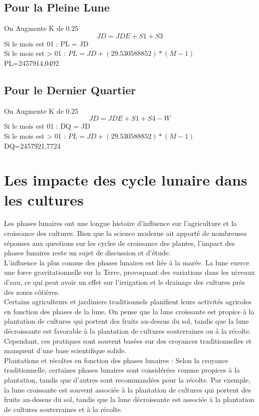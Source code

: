 \subsection{Pour la Pleine Lune}
On Augmente K de 0.25   
 \[JD = JDE + S1 + S3\] 
Si le mois est 01 : PL = JD\\
Si le mois est > 01 : $PL = JD + (29.530588852) * (M - 1)$ \\
PL=2457914,0492
\subsection{Pour le Dernier Quartier}
On Augmente K de 0.25  
 \[JD = JDE + S1 + S4 - W\]
Si le mois est 01 : DQ = JD\\ 
Si le mois est > 01 : $PL = JD + (29.530588852) * (M - 1)$\\ 
DQ=2457921,7724
\section{Les impacte des cycle lunaire dans les cultures}
Les phases lunaires ont une longue histoire d'influence sur l'agriculture et la croissance des cultures. Bien que la science moderne ait apporté de nombreuses réponses aux questions sur les cycles de croissance des plantes, l'impact des phases lunaires reste un sujet de discussion et d'étude.\\

L'influence la plus connue des phases lunaires est liée à la marée. La lune exerce une force gravitationnelle sur la Terre, provoquant des variations dans les niveaux d'eau, ce qui peut avoir un effet sur l'irrigation et le drainage des cultures près des zones côtières.\\

Certains agriculteurs et jardiniers traditionnels planifient leurs activités agricoles en fonction des phases de la lune. On pense que la lune croissante est propice à la plantation de cultures qui portent des fruits au-dessus du sol, tandis que la lune décroissante est favorable à la plantation de cultures souterraines ou à la récolte. Cependant, ces pratiques sont souvent basées sur des croyances traditionnelles et manquent d'une base scientifique solide.\\
Plantations et récoltes en fonction des phases lunaires : Selon la croyance traditionnelle, certaines phases lunaires sont considérées comme propices à la plantation, tandis que d'autres sont recommandées pour la récolte. Par exemple, la lune croissante est souvent associée à la plantation de cultures qui portent des fruits au-dessus du sol, tandis que la lune décroissante est associée à la plantation de cultures souterraines et à la récolte.\\

